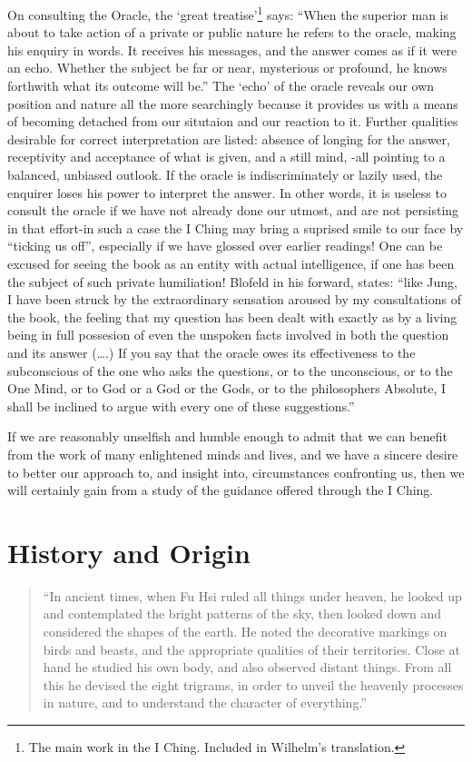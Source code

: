 \documentclass[11pt]{book}
\begin{document}
On consulting the Oracle, the `great treatise'\footnote{The main work in the I Ching. Included in Wilhelm's translation.} says: ``When the superior man is about to take action of a private or public nature he refers to the oracle, making his enquiry in words. It receives his messages, and the answer comes as if it were an echo. Whether the subject be far or near, mysterious or profound, he knows forthwith what its outcome will be.'' The `echo' of the oracle reveals our own position and nature all the more searchingly because it provides us with a means of becoming detached from our situtaion and our reaction to it. Further qualities desirable for correct interpretation are listed: absence of longing for the answer, receptivity and acceptance of what is given, and a still mind, -all pointing to a balanced, unbiased outlook. If the oracle is indiscriminately or lazily used, the enquirer loses his power to interpret the answer. In other words, it is useless to consult the oracle if we have not already done our utmost, and are not persisting in that effort-in such a case the I Ching may bring a suprised smile to our face by ``ticking us off'', especially if we have glossed over earlier readings! One can be excused for seeing the book as an entity with actual intelligence, if one has been the subject of such private humiliation! Blofeld in his forward, states: ``like Jung, I have been struck by the extraordinary sensation aroused by my consultations of the book, the feeling that my question has been dealt with exactly as by a living being in full possesion of even the unspoken facts involved in both the question and its answer (\ldots.) If you say that the oracle owes its effectiveness to the subconscious of the one who asks the questions, or to the unconscious, or to the One Mind, or to God or a God or the Gods, or to the philosophers Absolute, I shall be inclined to argue with every one of these suggestions.''

If we are reasonably unselfish and humble enough to admit that we can benefit from the work of many enlightened minds and lives, and we have a sincere desire to better our approach to, and insight into, circumstances confronting us, then we will certainly gain from a study of the guidance offered through the I Ching.


\section{History and Origin}

\begin{quote}
  ``In ancient times, when Fu Hsi ruled all things under heaven, he looked up and contemplated the bright patterns of the sky, then looked down and considered the shapes of the earth. He noted the decorative markings on birds and beasts, and the appropriate qualities of their territories. Close at hand he studied his own body, and also observed distant things. From all this he devised the eight trigrams, in order to unveil the heavenly processes in nature, and to understand the character of everything.''
\end{quote}
\end{document}
